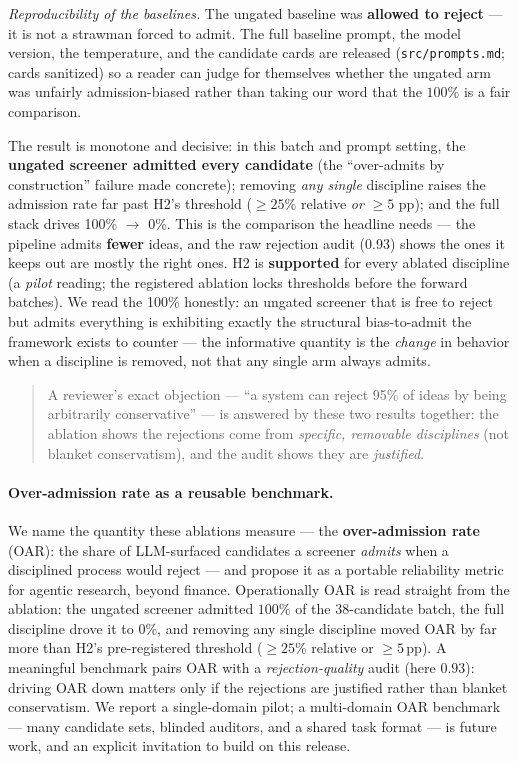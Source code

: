 \documentclass[11pt]{article}
\begin{document}
\noindent\emph{Reproducibility of the baselines.} The ungated baseline was \textbf{allowed to
reject} --- it is not a strawman forced to admit. The full baseline prompt, the model version, the
temperature, and the candidate cards are released (\texttt{src/prompts.md}; cards sanitized) so a
reader can judge for themselves whether the ungated arm was unfairly admission-biased rather than
taking our word that the $100\%$ is a fair comparison.

The result is monotone and decisive: in this batch and prompt setting, the
\textbf{ungated screener admitted every candidate} (the ``over-admits by construction'' failure made concrete);
removing \emph{any single} discipline raises the admission rate far past H2's
threshold ($\geq 25\%$ relative \emph{or} $\geq 5$ pp); and the full stack
drives 100\% $\to$ 0\%.
This is the comparison the headline needs --- the pipeline admits \textbf{fewer}
ideas, and the raw rejection audit (0.93) shows the ones it keeps out are mostly
the right ones.
H2 is \textbf{supported} for every ablated discipline (a \emph{pilot} reading;
the registered ablation locks thresholds before the forward batches).
We read the 100\% honestly: an ungated screener that is free to reject but admits
everything is exhibiting exactly the structural bias-to-admit the framework
exists to counter --- the informative quantity is the \emph{change} in behavior
when a discipline is removed, not that any single arm always admits.

\begin{quote}
A reviewer's exact objection --- ``a system can reject 95\% of ideas by being
arbitrarily conservative'' --- is answered by these two results together: the
ablation shows the rejections come from \emph{specific, removable disciplines}
(not blanket conservatism), and the audit shows they are \emph{justified}.
\end{quote}

\paragraph{Over-admission rate as a reusable benchmark.} We name the quantity these ablations
measure --- the \textbf{over-admission rate} (OAR): the share of LLM-surfaced candidates a screener
\emph{admits} when a disciplined process would reject --- and propose it as a portable reliability
metric for agentic research, beyond finance. Operationally OAR is read straight from the ablation: the
ungated screener admitted $100\%$ of the $38$-candidate batch, the full discipline drove it to $0\%$, and removing
any single discipline moved OAR by far more than H2's pre-registered threshold ($\geq 25\%$ relative or
$\geq 5$\,pp). A meaningful benchmark pairs OAR with a \emph{rejection-quality} audit (here $0.93$):
driving OAR down matters only if the rejections are justified rather than blanket conservatism. We
report a single-domain pilot; a multi-domain OAR benchmark --- many candidate sets, blinded auditors,
and a shared task format --- is future work, and an explicit invitation to build on this release.
\end{document}
